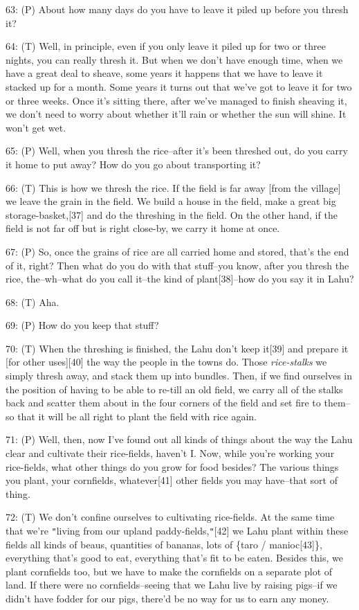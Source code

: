 63: (P) About how many days do you have to leave it piled up before you thresh
it?

64: (T) Well, in principle, even if you only leave it piled up for two or three
nights, you can really thresh it. But when we don't have enough time, when we have
a great deal to sheave, some years it happens that we have to leave it stacked
up for a month. Some years it turns out that we've got to leave it for two or three
weeks. Once it's sitting there, after we've managed to finish sheaving it, we don't
need to worry about whether it'll rain or whether the sun will shine. It won't
get wet.

65: (P) Well, when you thresh the rice--after it's been threshed out, do you carry
it home to put away? How do you go about transporting it?

66: (T) This is how we thresh the rice. If the field is far away [from the village]
we leave the grain in the field. We build a house in the field, make a great big
storage-basket,[37] and do the threshing in the field. On the other hand, if the
field is not far off but is right close-by, we carry it home at once.

67: (P) So, once the grains of rice are all carried home and stored, that's the
end of it, right? Then what do you do with that stuff--you know, after you thresh
the rice, the--wh--what do you call it--the kind of plant[38]--how do you say it
in Lahu?

68: (T) Aha.

69: (P) How do you keep that stuff?

70: (T) When the threshing is finished, the Lahu don't keep it[39] and prepare
it [for other uses][40] the way the people in the towns do. Those \textit{rice-stalks}
we simply thresh away, and stack them up into bundles. Then, if we find ourselves
in the position of having to be able to re-till an old field, we carry all of the
stalks back and scatter them about in the four corners of the field and set fire
to them--so that it will be all right to plant the field with rice again.

71: (P) Well, then, now I've found out all kinds of things about the way the Lahu
clear and cultivate their rice-fields, haven't I. Now, while you're working your
rice-fields, what other things do you grow for food besides? The various things
you plant, your cornfields, whatever[41] other fields you may have--that sort of
thing.

72: (T) We don't confine ourselves to cultivating rice-fields. At the same time
that we're \texttt{"}living from our upland paddy-fields,\texttt{"}[42] we Lahu
plant within these fields all kinds of beaus, quantities of bananas, lots of \{taro
/ manioc[43]\}, everything that's good to eat, everything that's fit to be eaten.
Besides this, we plant cornfields too, but we have to make the cornfields on a
separate plot of land. If there were no cornfields--seeing that we Lahu live by
raising pigs--if we didn't have fodder for our pigs, there'd be no way for us to
earn any money.

